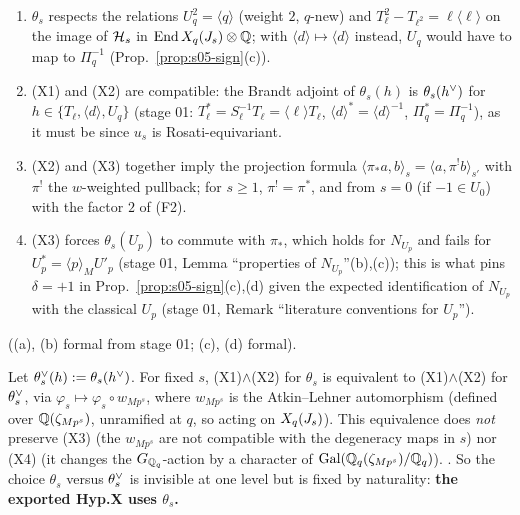 \begin{lemma}\label{lem:s05-consistency}
\begin{enumerate}[label=(\alph*)]
\item $\theta_s$ respects the relations $U_q^2=\langle q\rangle$ (weight $2$, $q$-new) and $T_\ell^2-T_{\ell^2}=\ell\langle\ell\rangle$
  on the image of $\mathcal{H}_s$ in $\operatorname{End}X_q(J_s)\otimes\mathbb{Q}$; with $\langle d\rangle\mapsto\langle d\rangle$ instead, $U_q$ would have to map to
  $\Pi_q^{-1}$ (Prop.~\ref{prop:s05-sign}(c)).
\item (X1) and (X2) are compatible: the Brandt adjoint of $\theta_s(h)$ is $\theta_s(h^\vee)$ for $h\in\{T_\ell,\langle d\rangle,U_q\}$
  (stage 01: $T_\ell^*=S_\ell^{-1}T_\ell=\langle\ell\rangle T_\ell$, $\langle d\rangle^*=\langle d\rangle^{-1}$, $\Pi_q^*=\Pi_q^{-1}$), as
  it must be since $u_s$ is Rosati-equivariant.
\item (X2) and (X3) together imply the projection formula $\langle\pi_*a,b\rangle_s=\langle a,\pi^!b\rangle_{s'}$ with $\pi^!$ the
  $w$-weighted pullback; for $s\ge1$, $\pi^!=\pi^*$, and from $s=0$ (if $-1\in U_0$) with the factor $2$ of (F2).
\item (X3) forces $\theta_s(U_p)$ to commute with $\pi_*$, which holds for $N_{U_p}$ and fails for $U_p^*=\langle p\rangle_MU'_p$
  (stage 01, Lemma ``properties of $N_{U_p}$''(b),(c)); this is what pins $\delta=+1$ in Prop.~\ref{prop:s05-sign}(c),(d) given the expected
  identification of $N_{U_p}$ with the classical $U_p$ (stage 01, Remark ``literature conventions for $U_p$'').
\end{enumerate}
\sttoprove{} ((a), (b) formal from stage 01; (c), (d) formal).
\end{lemma}

\begin{proposition}\label{prop:s05-AL}
Let $\theta_s^\vee(h):=\theta_s(h^\vee)$. For fixed $s$, (X1)$\wedge$(X2) for $\theta_s$ is equivalent to (X1)$\wedge$(X2) for
$\theta^\vee_s$, via $\varphi_s\mapsto\varphi_s\circ w_{Mp^s}$, where $w_{Mp^s}$ is the Atkin--Lehner automorphism (defined over
$\mathbb{Q}(\zeta_{Mp^s})$, unramified at $q$, so acting on $X_q(J_s)$). This equivalence does \emph{not} preserve (X3) (the $w_{Mp^s}$ are
not compatible with the degeneracy maps in $s$) nor (X4) (it changes the $G_{\mathbb{Q}_q}$-action by a character of
$\mathrm{Gal}(\mathbb{Q}_q(\zeta_{Mp^s})/\mathbb{Q}_q)$). \sttoprove. So the choice $\theta_s$ versus $\theta_s^\vee$ is invisible at one level but
is fixed by naturality: \textbf{the exported Hyp.X uses $\theta_s$.}
\end{proposition}

